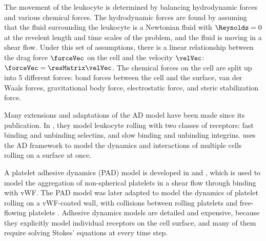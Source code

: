 The movement of the leukocyte is determined by balancing hydrodynamic
forces and various chemical forces. The hydrodynamic forces are found
by assuming that the fluid surrounding the leukocyte is a Newtonian
fluid with $\Reynolds = 0$ at the revelent length and time scales of
the problem, and the fluid is moving in a shear flow. Under this set
of assumptions, there is a linear relationship between the drag force
$\forceVec$ on the cell and the velocity $\velVec$: $\forceVec =
\resMatrix \velVec$. The chemical forces on the cell are split up into
5 different forces: bond forces between the cell and the surface, van
der Waals forces, gravitational body force, electrostatic force, and
steric stabilization force.

Many extensions and adaptations of the AD model have been made since
its publication. In \cite{Bhatia2003}, they model leukocyte rolling
with two classes of receptors: fast binding and unbinding selectins,
and slow binding and unbinding integrins. \cite{King2001} uses the AD
framework to model the dynamics and interactions of multiple cells
rolling on a surface at once. 

A platelet adhesive dynamics (PAD) model is developed in
\cite{Mody2008a} and \cite{Mody2008b}, which is used to model the
aggregation of non-spherical platelets in a shear flow through binding
with vWF. The PAD model was later adapted to model the dynamics of
platelet rolling on a vWF-coated wall, with collisions between rolling
platelets and free-flowing platelets \cite{Wang2013}. Adhesive
dynamics models are detailed and expensive, because they explicitly
model individual receptors on the cell surface, and many of them
require solving Stokes' equations at every time step.

